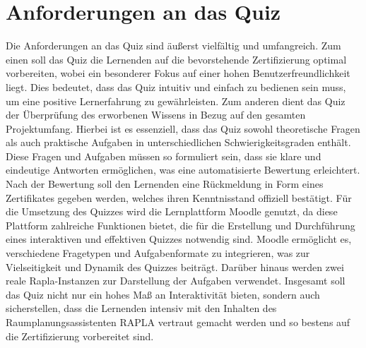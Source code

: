 \section{Anforderungen an das Quiz}
Die Anforderungen an das Quiz sind äußerst vielfältig und umfangreich. Zum einen soll das Quiz die Lernenden auf die bevorstehende Zertifizierung optimal vorbereiten, wobei ein besonderer Fokus auf einer hohen Benutzerfreundlichkeit liegt. Dies bedeutet, dass das Quiz intuitiv und einfach zu bedienen sein muss, um eine positive Lernerfahrung zu gewährleisten. Zum anderen dient das Quiz der Überprüfung des erworbenen Wissens in Bezug auf den gesamten Projektumfang. Hierbei ist es essenziell, dass das Quiz sowohl theoretische Fragen als auch praktische Aufgaben in unterschiedlichen Schwierigkeitsgraden enthält. Diese Fragen und Aufgaben müssen so formuliert sein, dass sie klare und eindeutige Antworten ermöglichen, was eine automatisierte Bewertung erleichtert. Nach der Bewertung soll den Lernenden eine Rückmeldung in Form eines Zertifikates gegeben werden, welches ihren Kenntnisstand offiziell bestätigt.
Für die Umsetzung des Quizzes wird die Lernplattform Moodle genutzt, da diese Plattform zahlreiche Funktionen bietet, die für die Erstellung und Durchführung eines interaktiven und effektiven Quizzes notwendig sind. Moodle ermöglicht es, verschiedene Fragetypen und Aufgabenformate zu integrieren, was zur Vielseitigkeit und Dynamik des Quizzes beiträgt. Darüber hinaus werden zwei reale Rapla-Instanzen zur Darstellung der Aufgaben verwendet. Insgesamt soll das Quiz nicht nur ein hohes Maß an Interaktivität bieten, sondern auch sicherstellen, dass die Lernenden intensiv mit den Inhalten des Raumplanungsassistenten RAPLA vertraut gemacht werden und so bestens auf die Zertifizierung vorbereitet sind.

